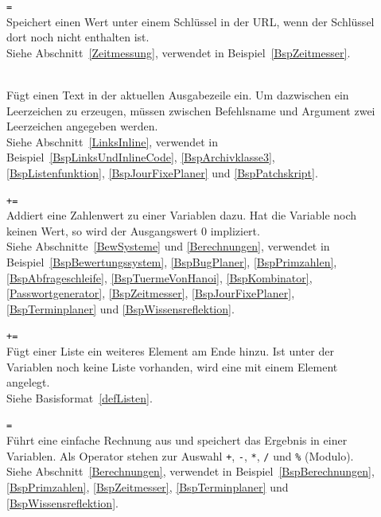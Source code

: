 \begin{description}
\item[]  \verb|=| \\
Speichert einen Wert unter einem Schlüssel in der URL, wenn der Schlüssel dort noch nicht enthalten ist.\\
Siehe Abschnitt~\ref{Zeitmessung}, verwendet in Beispiel~\ref{BspZeitmesser}.

\item[] \\
Fügt einen Text in der aktuellen Ausgabezeile ein. Um dazwischen ein Leerzeichen zu erzeugen, müssen zwischen Befehlsname und Argument zwei Leerzeichen angegeben werden.\\
Siehe Abschnitt~\ref{LinksInline}, verwendet in Beispiel~\ref{BspLinksUndInlineCode}, \ref{BspArchivklasse3}, \ref{BspListenfunktion}, \ref{BspJourFixePlaner} und \ref{BspPatchskript}.

\item[]  \verb|+=| \\
Addiert eine Zahlenwert zu einer Variablen dazu. Hat die Variable noch keinen Wert, so wird der Ausgangswert $0$ impliziert.\\
Siehe Abschnitte~\ref{BewSysteme} und \ref{Berechnungen}, verwendet in Beispiel~\ref{BspBewertungssystem}, \ref{BspBugPlaner}, \ref{BspPrimzahlen}, \ref{BspAbfrageschleife}, \ref{BspTuermeVonHanoi}, \ref{BspKombinator}, \ref{Passwortgenerator}, \ref{BspZeitmesser}, \ref{BspJourFixePlaner}, \ref{BspTerminplaner} und \ref{BspWissensreflektion}.

\item[]  \verb|+=| \\
Fügt einer Liste ein weiteres Element am Ende hinzu. Ist unter der Variablen noch keine Liste vorhanden, wird eine mit einem Element angelegt.\\
Siehe Basisformat~\ref{defListen}.

\item[]  \verb|=|   \\
Führt eine einfache Rechnung aus und speichert das Ergebnis in einer Variablen. Als Operator stehen zur Auswahl \verb|+|, \verb|-|, \verb|*|, \verb|/| und \verb|%| (Modulo).\\
Siehe Abschnitt~\ref{Berechnungen}, verwendet in Beispiel~\ref{BspBerechnungen}, \ref{BspPrimzahlen}, \ref{BspZeitmesser}, \ref{BspTerminplaner} und \ref{BspWissensreflektion}.


\end{description}
